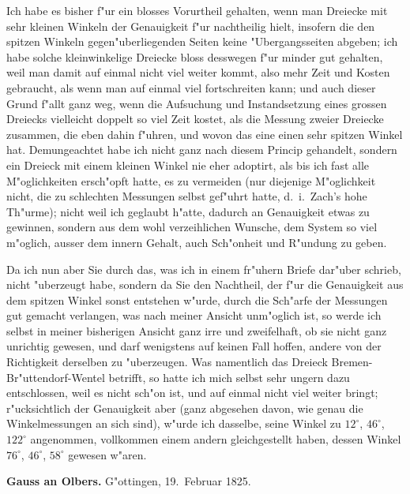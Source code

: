 \documentclass[12pt,a4paper]{article}
\theoremstyle{plain}
\theoremstyle{definition}
\theoremstyle{remark}
\begin{document}
Ich habe es bisher f"ur ein blosses Vorurtheil gehalten, wenn man Dreiecke mit sehr kleinen Winkeln der Genauigkeit f"ur nachtheilig hielt, insofern die den spitzen Winkeln gegen"uberliegenden Seiten keine "Ubergangsseiten abgeben; ich habe solche kleinwinkelige Dreiecke bloss desswegen f"ur minder gut gehalten, weil man damit auf einmal nicht viel weiter kommt, also mehr Zeit und Kosten gebraucht, als wenn man auf einmal viel fortschreiten kann; und auch dieser Grund f"allt ganz weg, wenn die Aufsuchung und Instandsetzung eines grossen Dreiecks vielleicht doppelt so viel Zeit kostet, als die Messung zweier Dreiecke zusammen, die eben dahin f"uhren, und wovon das eine einen sehr spitzen Winkel hat. Demungeachtet habe ich nicht ganz nach diesem Princip gehandelt, sondern ein Dreieck mit einem kleinen Winkel nie eher adoptirt, als bis ich fast alle M"oglichkeiten ersch"opft hatte, es zu vermeiden (nur diejenige M"oglichkeit nicht, die zu schlechten Messungen selbst gef"uhrt hatte, d.\ i.\ Zach's hohe Th"urme); nicht weil ich geglaubt h"atte, dadurch an Genauigkeit etwas zu gewinnen, sondern aus dem wohl verzeihlichen Wunsche, dem System so viel m"oglich, ausser dem innern Gehalt, auch Sch"onheit und R"undung zu geben.

Da ich nun aber Sie durch das, was ich in einem fr"uhern Briefe dar"uber schrieb, nicht "uberzeugt habe, sondern da Sie den Nachtheil, der f"ur die Genauigkeit aus dem spitzen Winkel sonst entstehen w"urde, durch die Sch"arfe der Messungen gut gemacht verlangen, was nach meiner Ansicht unm"oglich ist, so werde ich selbst in meiner bisherigen Ansicht ganz irre und zweifelhaft, ob sie nicht ganz unrichtig gewesen, und darf wenigstens auf keinen Fall hoffen, andere von der Richtigkeit derselben zu "uberzeugen. Was namentlich das Dreieck Bremen-Br"uttendorf-Wentel betrifft, so hatte ich mich selbst sehr ungern dazu entschlossen, weil es nicht sch"on ist, und auf einmal nicht viel weiter bringt; r"ucksichtlich der Genauigkeit aber (ganz abgesehen davon, wie genau die Winkelmessungen an sich sind), w"urde ich dasselbe, seine Winkel zu $12^{\circ}$, $46^{\circ}$, $122^{\circ}$ angenommen, vollkommen einem andern gleichgestellt haben, dessen Winkel $76^{\circ}$, $46^{\circ}$, $58^{\circ}$ gewesen w"aren.

\newpage
\noindent \textbf{Gauss an Olbers.} G"ottingen, 19.~Februar 1825.
\end{document}
